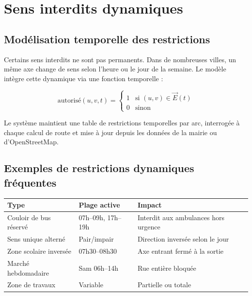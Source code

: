 \documentclass[12pt,a4paper]{article}
\theoremstyle{definition}
\theoremstyle{remark}
\begin{document}
\newpage

\section{Sens interdits dynamiques}

\subsection{Modélisation temporelle des restrictions}

Certains sens interdits ne sont pas permanents. Dans de nombreuses
villes, un même axe change de sens selon l'heure ou le jour de la
semaine. Le modèle intègre cette dynamique via une fonction temporelle :

\[
  \text{autorisé}(u, v, t) =
  \begin{cases}
    1 & \text{si } (u,v) \in \vec{E}(t) \\
    0 & \text{sinon}
  \end{cases}
\]

Le système maintient une table de restrictions temporelles par arc,
interrogée à chaque calcul de route et mise à jour depuis les données
de la mairie ou d'OpenStreetMap.

\subsection{Exemples de restrictions dynamiques fréquentes}

\begin{center}
\begin{tabular}{lll}
  \toprule
  \textbf{Type} & \textbf{Plage active} & \textbf{Impact} \\
  \midrule
  Couloir de bus réservé     & 07h–09h, 17h–19h & Interdit aux ambulances hors urgence \\
  Sens unique alterné        & Pair/impair       & Direction inversée selon le jour \\
  Zone scolaire inversée     & 07h30–08h30       & Axe entrant fermé à la sortie \\
  Marché hebdomadaire        & Sam 06h–14h       & Rue entière bloquée \\
  Zone de travaux            & Variable          & Partielle ou totale \\
  \bottomrule
\end{tabular}
\end{center}
\end{document}
